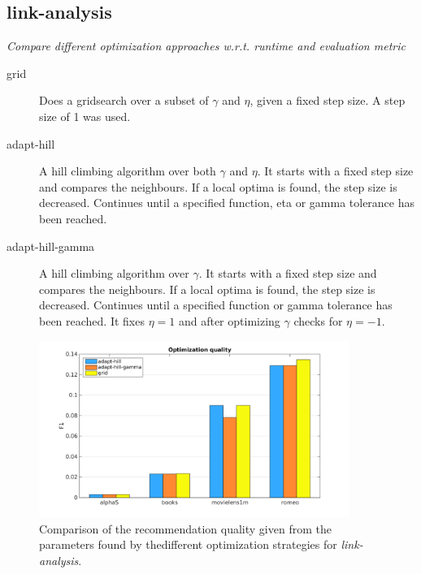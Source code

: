 
\subsection{link-analysis}\label{sec:tuning:link}

\textit{Compare different optimization approaches w.r.t. runtime and evaluation metric}

\begin{description}
    \item[grid]
        Does a gridsearch over a subset of $\gamma$ and $\eta$, given a fixed step size. A step size of 1 was used.
    \item[adapt-hill]
        A hill climbing algorithm over both $\gamma$ and $\eta$. It starts with a fixed step size and compares the neighbours. If a local optima is found, the step size is decreased. Continues until a specified function, eta or gamma tolerance has been reached.
    \item[adapt-hill-gamma]
        A hill climbing algorithm over $\gamma$. It starts with a fixed step size and compares the neighbours. If a local optima is found, the step size is decreased. Continues until a specified function or gamma tolerance has been reached. It fixes $\eta = 1$ and after optimizing $\gamma$ checks for $\eta = -1$.
\end{description}


\begin{figure}[h!]
    \centering
    \includegraphics[width=0.9\textwidth]{fig/comp/comp_link_quality.png}
    \caption{Comparison of the recommendation quality given from the parameters found by thedifferent optimization strategies for \textit{link-analysis}.}
\end{figure}

